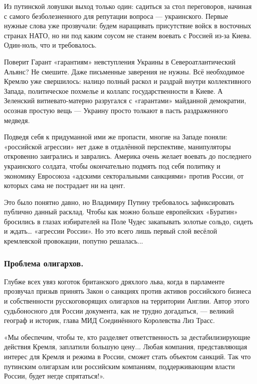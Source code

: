 Из путинской ловушки выход только один: садиться за стол переговоров, начиная с
самого безболезненного для репутации вопроса — украинского. Первые нужные слова
уже прозвучали: будем наращивать присутствие войск в восточных странах НАТО, но
ни под каким соусом не станем воевать с Россией из-за Киева. Один-ноль, что и
требовалось.

Поверит Гарант «гарантиям» невступления Украины в Североатлантический Альянс?
Не смешите. Даже письменные заверения не нужны. Всё необходимое Кремлю уже
свершилось: налицо полный раскол и раздрай внутри коллективного Запада,
политическое похмелье и коллапс государственности в Киеве. А Зеленский
витиевато-матерно разругался с «гарантами» майданной демократии, осознав
простую вещь — Украину просто толкают в пасть раздраженного медведя.

Подведя себя к придуманной ими же пропасти, многие на Западе поняли:
«российской агрессии» нет даже в отдалённой перспективе, манипуляторы
откровенно заигрались и заврались. Америка очень желает воевать до последнего
украинского солдата, чтобы окончательно подмять под себя политику и экономику
Евросоюза «адскими секторальными санкциями» против России, от которых сама не
пострадает ни на цент.

Это было понятно давно, но Владимиру Путину требовалось зафиксировать публично
данный расклад. Чтобы как можно больше европейских «Буратин» бросились в глазах
избирателей на Поле Чудес закапывать золотые сольдо, сидеть и ждать… «агрессии
России». Но это всего лишь первый слой весёлой кремлевской провокации, попутно
решалась...

\subsubsection{Проблема олигархов.}

Глубже всех увяз коготок британского дряхлого льва, когда в парламенте
прозвучал призыв принять Закон о санкциях против активов российского бизнеса и
собственности русскоговорящих олигархов на территории Англии. Автор этого
судьбоносного для России документа, как не трудно догадаться, — великий географ
и историк, глава МИД Соединённого Королевства Лиз Трасс.

\begin{zznagolos}
«Мы обеспечим, чтобы те, кто разделяет ответственность за дестабилизирующие
действия Кремля, заплатили большую цену... Любая компания, представляющая
интерес для Кремля и режима в России, сможет стать объектом санкций. Так что
путинским олигархам или российским компаниям, поддерживающим власти России,
будет негде спрятаться!».	
\end{zznagolos}

